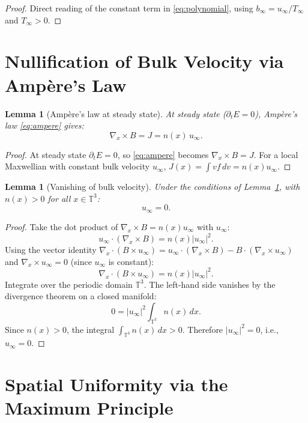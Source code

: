 \documentclass[11pt]{article}
\newcommand{\T}{\mathbb{T}}
\newtheorem{lemma}[theorem]{Lemma}
\begin{document}
\begin{proof}
Direct reading of the constant term in \eqref{eq:polynomial}, using $b_\infty = u_\infty / T_\infty$ and $T_\infty > 0$.
\end{proof}

\section{Nullification of Bulk Velocity via Amp\`ere's Law}
\label{sec:ampere}

\begin{lemma}[Amp\`ere's law at steady state]
\label{lem:ampere_steady}
At steady state ($\partial_t E = 0$), Amp\`ere's law \eqref{eq:ampere} gives:
\[
\nabla_x \times B = J = n(x) \, u_\infty.
\]
\end{lemma}

\begin{proof}
At steady state $\partial_t E = 0$, so \eqref{eq:ampere} becomes $\nabla_x \times B = J$. For a local Maxwellian with constant bulk velocity $u_\infty$, $J(x) = \int v f \, dv = n(x) u_\infty$.
\end{proof}

\begin{lemma}[Vanishing of bulk velocity]
\label{lem:u_zero}
Under the conditions of Lemma~\ref{lem:ampere_steady}, with $n(x) > 0$ for all $x \in \T^3$:
\[
u_\infty = 0.
\]
\end{lemma}

\begin{proof}
Take the dot product of $\nabla_x \times B = n(x) u_\infty$ with $u_\infty$:
\[
u_\infty \cdot (\nabla_x \times B) = n(x) |u_\infty|^2.
\]
Using the vector identity $\nabla_x \cdot (B \times u_\infty) = u_\infty \cdot (\nabla_x \times B) - B \cdot (\nabla_x \times u_\infty)$ and $\nabla_x \times u_\infty = 0$ (since $u_\infty$ is constant):
\[
\nabla_x \cdot (B \times u_\infty) = n(x)|u_\infty|^2.
\]
Integrate over the periodic domain $\T^3$. The left-hand side vanishes by the divergence theorem on a closed manifold:
\[
0 = |u_\infty|^2 \int_{\T^3} n(x) \, dx.
\]
Since $n(x) > 0$, the integral $\int_{\T^3} n(x) \, dx > 0$. Therefore $|u_\infty|^2 = 0$, i.e., $u_\infty = 0$.
\end{proof}

\section{Spatial Uniformity via the Maximum Principle}
\label{sec:maximum_principle}
\end{document}
